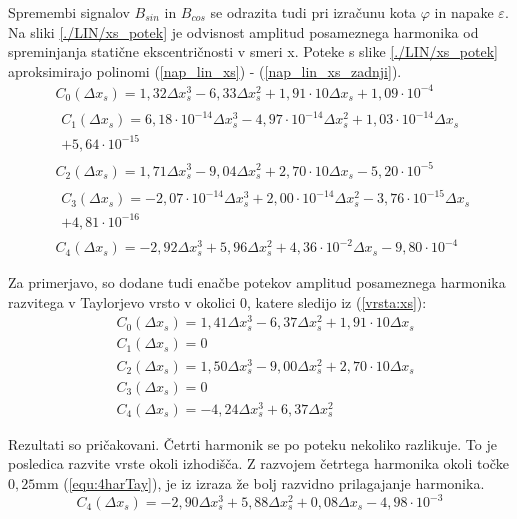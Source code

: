 \newpage
Spremembi signalov $B_{sin}$ in $B_{cos}$ se odrazita tudi pri izračunu kota $\varphi$ in napake $\varepsilon$.
Na sliki \ref{./LIN/xs_potek} je odvisnost amplitud posameznega harmonika od spreminjanja statične ekscentričnosti v smeri x. Poteke s slike \ref{./LIN/xs_potek} aproksimirajo polinomi (\ref{nap_lin_xs}) - (\ref{nap_lin_xs_zadnji}).
\begin{eqnarray}
\label{nap_lin_xs}
&C_0(\Delta x_s) =1,32\Delta x_s^{3}-6,33\Delta x_s^{2}+1,91\cdot 10\Delta x_s+1,09\cdot 10^{-4} \\                                    
&\begin{split}C_1(\Delta x_s) =6,18\cdot 10^{-14}\Delta x_s^{3}-4,97\cdot 10^{-14}\Delta x_s^{2}+1,03\cdot 10^{-14}\Delta x_s\\+5,64\cdot 10^{-15} \end{split}\\ 
&C_2(\Delta x_s) =1,71\Delta x_s^{3}-9,04\Delta x_s^{2}+2,70\cdot 10\Delta x_s-5,20\cdot 10^{-5} \\                                    
&\begin{split}C_3(\Delta x_s) =-2,07\cdot 10^{-14}\Delta x_s^{3}+2,00\cdot 10^{-14}\Delta x_s^{2}-3,76\cdot 10^{-15}\Delta x_s\\+4,81\cdot 10^{-16} \end{split}\\
\label{nap_lin_xs_zadnji}
&C_4(\Delta x_s) =-2,92\Delta x_s^{3}+5,96\Delta x_s^{2}+4,36\cdot 10^{-2}\Delta x_s-9,80\cdot 10^{-4}
\end{eqnarray}

Za primerjavo, so dodane tudi enačbe potekov amplitud posameznega harmonika razvitega v Taylorjevo vrsto v okolici 0, katere sledijo iz (\ref{vrsta:xs}):
\begin{eqnarray}
&C_0(\Delta x_s) =1,41\Delta x_s^{3}-6,37\Delta x_s^{2}+1,91\cdot 10\Delta x_s \\
&C_1(\Delta x_s) = 0\\
&C_2(\Delta x_s) =1,50\Delta x_s^{3}-9,00\Delta x_s^{2}+2,70\cdot 10\Delta x_s\\
&C_3(\Delta x_s) = 0\\
&C_4(\Delta x_s) =-4,24\Delta x_s^{3}+6,37\Delta x_s^{2}
\end{eqnarray}

Rezultati so pričakovani.
Četrti harmonik se po poteku nekoliko razlikuje. To je posledica razvite vrste okoli izhodišča. Z razvojem četrtega harmonika okoli točke $0,25 \mathrm{ mm}$ (\ref{equ:4harTay}), je iz izraza že bolj razvidno prilagajanje harmonika.
\begin{equation}
\label{equ:4harTay}
C_4(\Delta x_s) =-2,90\Delta x_s^{3}+5,88\Delta x_s^{2}+0,08 \Delta x_s - 4,98 \cdot 10^{-3}
\end{equation}


